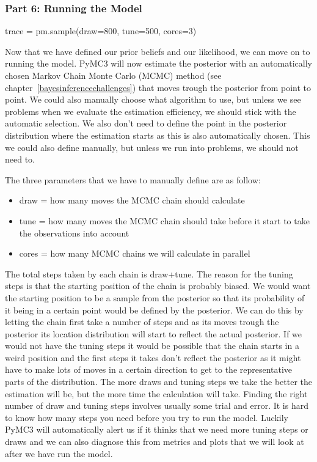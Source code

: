 \documentclass[12pt,a4paper,leqno]{report}
\theoremstyle{plain}
\theoremstyle{definition}
\theoremstyle{remark}
\begin{document}
\subsubsection*{Part 6: Running the Model}

\bigskip
\begin{pyverbatim}[][fontsize=\footnotesize]
trace = pm.sample(draw=800, tune=500, cores=3)
\end{pyverbatim}
\bigskip

Now that we have defined our prior beliefs and our likelihood, we can move on to running the
model. PyMC3 will now estimate the posterior with an automatically chosen Markov Chain
Monte Carlo (MCMC) method (see chapter\ \ref{bayesinferencechallenges})
that moves trough the posterior from point to point. We could also manually choose what
algorithm to use, but unless we see problems when we evaluate the estimation efficiency,
we should stick with the automatic selection. We also don't need to define the point in the
posterior distribution where the estimation starts as this is also automatically chosen. This
we could also define manually, but unless we run into problems, we should not need to.

The three parameters that we have to manually define are as follow:

\begin{itemize}
    \item[] draw = how many moves the MCMC chain should calculate
    \item[] tune = how many moves the MCMC chain should take before it start to
    take the observations into account
    \item[] cores = how many MCMC chains we will calculate in parallel
\end{itemize}

The total steps taken by each chain is draw+tune. The reason for the tuning steps is
that the starting position of the chain is probably biased. We would want the starting
position to be a sample from the posterior so that its probability of it being in a certain
point would be defined by the posterior. We can do this by letting the chain first take
a number of steps and as its moves trough the posterior its location distribution will start to
reflect the actual posterior. If we would not have the tuning steps it would be possible
that the chain starts in a weird position and the first steps it takes don't reflect the
posterior as it might have to make lots of moves in a certain direction to get to the
representative parts of the distribution. The more draws and tuning steps we take the
better the estimation will be, but the more time the calculation will take. Finding the
right number of draw and tuning steps involves usually some trial and error. It is
hard to know how many steps you need before you try to run the model. Luckily PyMC3 will
automatically alert us if it thinks that we need more tuning steps or draws and we can
also diagnose this from metrics and plots that we will look at after we have run the
model.
\end{document}
